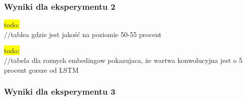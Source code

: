 \newpage %
\subsubsection{Wyniki dla eksperymentu 2}


\colorbox{yellow}{todo:}\\
//tablea gdzie jest jakość na poziomie 50-55 procent



\colorbox{yellow}{todo:}\\
//tabela dla roznych embedingow pokazujaca, że wartwa konwolucyjna jest o 5 procent gorsze od LSTM

\newpage %
\subsubsection{Wyniki dla eksperymentu 3}


